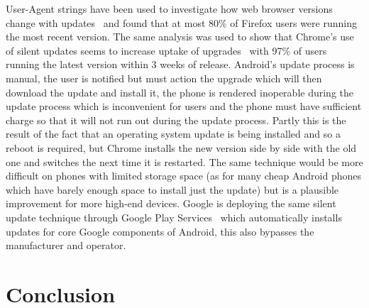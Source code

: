 \documentclass[conference,a4paper,twoside]{IEEEtran}
\begin{document}
User-Agent strings have been used to investigate how web browser versions change with updates~\cite{Frei2008} and found that at most 80\% of Firefox users were running the most recent version.
The same analysis was used to show that Chrome's use of silent updates seems to increase uptake of upgrades~\cite{Duebendorfer2010} with 97\% of users running the latest version within 3 weeks of release.
Android's update process is manual, the user is notified but must action the upgrade which will then download the update and install it, the phone is rendered inoperable during the update process which is inconvenient for users and the phone must have sufficient charge so that it will not run out during the update process.
Partly this is the result of the fact that an operating system update is being installed and so a reboot is required, but Chrome installs the new version side by side with the old one and switches the next time it is restarted.
The same technique would be more difficult on phones with limited storage space (as for many cheap Android phones which have barely enough space to install just the update) but is a plausible improvement for more high-end devices.
Google is deploying the same silent update technique through Google Play Services~\cite{TODO} which automatically installs updates for core Google components of Android, this also bypasses the manufacturer and operator.



\section{Conclusion}
\label{sec:conclusion}

\printbibliography
\end{document}
